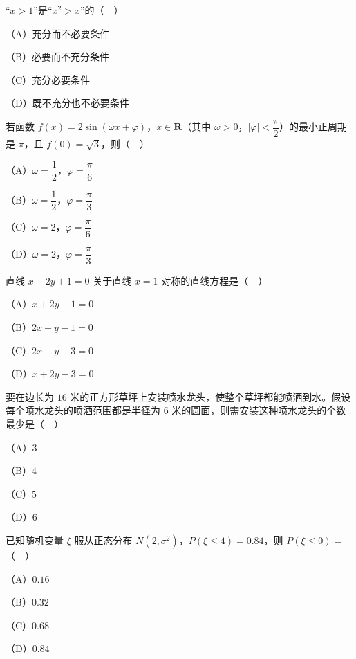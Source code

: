 


\begin{question}
“$x>1$”是“$x^2>x$”的（　）

（A）充分而不必要条件

（B）必要而不充分条件

（C）充分必要条件

（D）既不充分也不必要条件

\end{question}
\begin{question}
若函数 $f(x)=2\sin(\omega x+\varphi)$，$x\in\mathbf R$（其中 $\omega>0$，$|\varphi|<\dfrac{\pi}{2}$）的最小正周期是 $\pi$，且 $f(0)=\sqrt3$，则（　）

（A）$\omega=\dfrac12$，$\varphi=\dfrac{\pi}{6}$

（B）$\omega=\dfrac12$，$\varphi=\dfrac{\pi}{3}$

（C）$\omega=2$，$\varphi=\dfrac{\pi}{6}$

（D）$\omega=2$，$\varphi=\dfrac{\pi}{3}$

\end{question}
\begin{question}
直线 $x-2y+1=0$ 关于直线 $x=1$ 对称的直线方程是（　）

（A）$x+2y-1=0$

（B）$2x+y-1=0$

（C）$2x+y-3=0$

（D）$x+2y-3=0$

\Needspace{0.4\textheight}
\end{question}
\begin{question}
要在边长为 $16$ 米的正方形草坪上安装喷水龙头，使整个草坪都能喷洒到水。假设每个喷水龙头的喷洒范围都是半径为 $6$ 米的圆面，则需安装这种喷水龙头的个数最少是（　）
\nopagebreak[4]
\begin{center}\end{center}
\nopagebreak[4]
（A）$3$

（B）$4$

（C）$5$

（D）$6$

\end{question}
\begin{question}
已知随机变量 $\xi$ 服从正态分布 $N(2,\sigma^2)$，$P(\xi\leqslant4)=0.84$，则 $P(\xi\leqslant0)=$（　）

（A）$0.16$

（B）$0.32$

（C）$0.68$

（D）$0.84$

\end{question}
